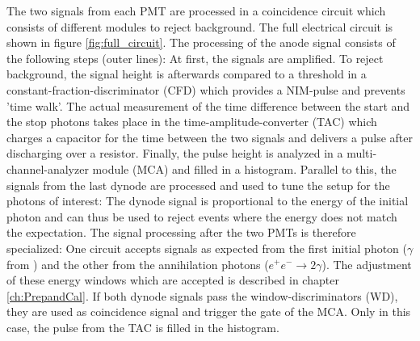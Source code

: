 \documentclass[
	paper=A4,
	parskip=full,
	chapterprefix=true,
	11pt,
	headings=normal,
	bibliography=totoc,
	listof=totoc,
	titlepage=on,
]{scrreprt}
\begin{document}
The two signals from each PMT are processed in a coincidence circuit which consists of different modules to reject background. The full electrical circuit is shown in figure \ref{fig:full_circuit}. The processing of the anode signal consists of the following steps (outer lines): At first, the signals are amplified. To reject background, the signal height is afterwards compared to a threshold in a constant-fraction-discriminator (CFD) which provides a NIM-pulse and prevents 'time walk'\cite{Lab_manual_T8}. The actual measurement of the time difference between the start and the stop photons takes place in the time-amplitude-converter (TAC) which charges a capacitor for the time between the two signals and delivers a pulse after discharging over a resistor. Finally, the pulse height is analyzed in a multi-channel-analyzer module (MCA) and filled in a histogram. Parallel to this, the signals from the last dynode are processed and used to tune the setup for the photons of interest: The dynode signal is proportional to the energy of the initial photon and can thus be used to reject events where the energy does not match the expectation. The signal processing after the two PMTs is therefore specialized: One circuit accepts signals as expected from the first initial photon ($\gamma$ from ) and the other from the annihilation photons ($e^+e^- \rightarrow 2\gamma$). The adjustment of these energy windows which are accepted is described in chapter \ref{ch:PrepandCal}. If both dynode signals pass the window-discriminators (WD), they are used as coincidence signal and trigger the gate of the MCA. Only in this case, the pulse from the TAC is filled in the histogram. 
\end{document}
